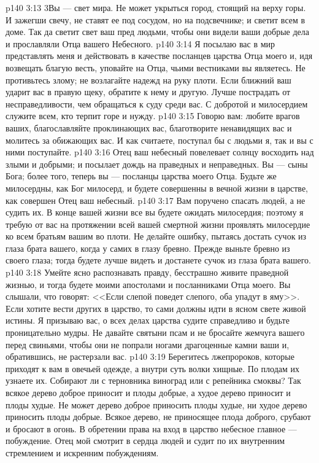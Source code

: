 \vs p140 3:13 3Вы --- свет мира. Не может укрыться город, стоящий на верху горы. И зажегши свечу, не ставят ее под сосудом, но на подсвечнике; и светит всем в доме. Так да светит свет ваш пред людьми, чтобы они видели ваши добрые дела и прославляли Отца вашего Небесного.
\vs p140 3:14 Я посылаю вас в мир представлять меня и действовать в качестве посланцев царства Отца моего и, идя возвещать благую весть, уповайте на Отца, чьими вестниками вы являетесь. Не противьтесь злому; не возлагайте надежд на руку плоти. Если ближний ваш ударит вас в правую щеку, обратите к нему и другую. Лучше пострадать от несправедливости, чем обращаться к суду среди вас. С добротой и милосердием служите всем, кто терпит горе и нужду.
\vs p140 3:15 Говорю вам: любите врагов ваших, благославляйте проклинающих вас, благотворите ненавидящих вас и молитесь за обижающих вас. И как считаете, поступал бы с людьми я, так и вы с ними поступайте.
\vs p140 3:16 Отец ваш небесный повелевает солнцу восходить над злыми и добрыми; и посылает дождь на праведных и неправедных. Вы --- сыны Бога; более того, теперь вы --- посланцы царства моего Отца. Будьте же милосердны, как Бог милосерд, и будете совершенны в вечной жизни в царстве, как совершен Отец ваш небесный.
\vs p140 3:17 Вам поручено спасать людей, а не судить их. В конце вашей жизни все вы будете ожидать милосердия; поэтому я требую от вас на протяжении всей вашей смертной жизни проявлять милосердие ко всем братьям вашим во плоти. Не делайте ошибку, пытаясь достать сучок из глаза брата вашего, когда у самих в глазу бревно. Прежде выньте бревно из своего глаза; тогда будете лучше видеть и достанете сучок из глаза брата вашего.
\vs p140 3:18 Умейте ясно распознавать правду, бесстрашно живите праведной жизнью, и тогда будете моими апостолами и посланниками Отца моего. Вы слышали, что говорят: <<Если слепой поведет слепого, оба упадут в яму>>. Если хотите вести других в царство, то сами должны идти в ясном свете живой истины. Я призываю вас, о всех делах царства судите справедливо и будьте проницательно мудры. Не давайте святыни псам и не бросайте жемчуга вашего перед свиньями, чтобы они не попрали ногами драгоценные камни ваши и, обратившись, не растерзали вас.
\vs p140 3:19 Берегитесь лжепророков, которые приходят к вам в овечьей одежде, а внутри суть волки хищные. По плодам их узнаете их. Собирают ли с терновника виноград или с репейника смоквы? Так всякое дерево доброе приносит и плоды добрые, а худое дерево приносит и плоды худые. Не может дерево доброе приносить плоды худые, ни худое дерево приносить плоды добрые. Всякое дерево, не приносящее плода доброго, срубают и бросают в огонь. В обретении права на вход в царство небесное главное --- побуждение. Отец мой смотрит в сердца людей и судит по их внутренним стремлением и искренним побуждениям.
